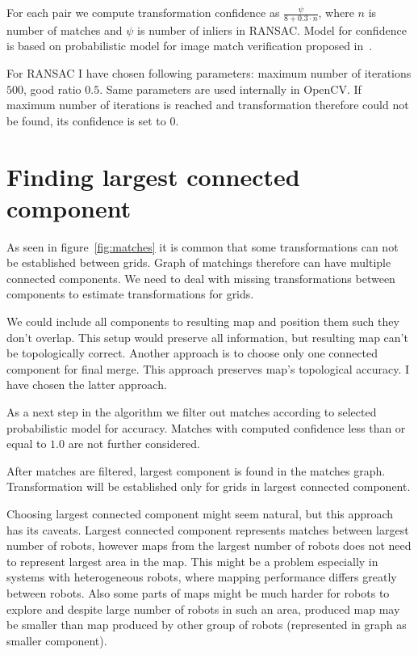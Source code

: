 For each pair we compute transformation confidence as $\frac{\psi}{8 + 0.3 \cdot n}$, where $n$ is number of matches and $\psi$ is number of inliers in \gls{RANSAC}. Model for confidence is based on probabilistic model for image match verification proposed in~\cite{Brown2006}.

For \gls{RANSAC} I have chosen following parameters: maximum number of iterations $500$, good ratio $0.5$. Same parameters are used internally in \gls{OpenCV}. If maximum number of iterations is reached and transformation therefore could not be found, its confidence is set to $0$.


\section{Finding largest connected component} %
\label{sec:findinglargestconnectedcomponent}

As seen in figure~\ref{fig:matches} it is common that some transformations can not be established between grids. Graph of matchings therefore can have multiple connected components. We need to deal with missing transformations between components to estimate transformations for grids.

We could include all components to resulting map and position them such they don't overlap. This setup would preserve all information, but resulting map can't be topologically correct. Another approach is to choose only one connected component for final merge. This approach preserves map's topological accuracy. I have chosen the latter approach.

As a next step in the algorithm we filter out matches according to selected probabilistic model for accuracy. Matches with computed confidence less than or equal to $1.0$ are not further considered.

After matches are filtered, largest component is found in the matches graph. Transformation will be established only for grids in largest connected component.

Choosing largest connected component might seem natural, but this approach has its caveats. Largest connected component represents matches between largest number of robots, however maps from the largest number of robots does not need to represent largest area in the map. This might be a problem especially in systems with heterogeneous robots, where mapping performance differs greatly between robots. Also some parts of maps might be much harder for robots to explore and despite large number of robots in such an area, produced map may be smaller than map produced by other group of robots (represented in graph as smaller component).

